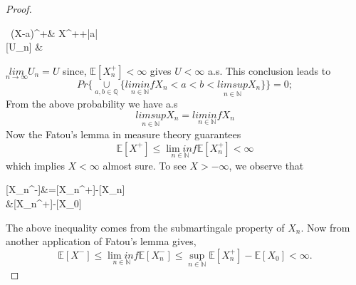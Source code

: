 \documentclass[a4paper,10pt,english]{article}
\begin{document}
    	\begin{proof}
    		\begin{flalign*}\
    			(X-a)^{+}\leq& X^{+}+|a|\\
    			[U_n] \leq& \\
    			\end{flalign*}
    			$\underset{n\to \infty}{lim} U_n=U$ since, $\mathbb{E} [X_n^{+}]< \infty$ gives $U<\infty$ a.s. This conclusion leads to  
    			\begin{equation*}
    			Pr\{\underset{a,b \in \mathbb{Q}}{\cup}\{\underset{n\in \mathbb{N}}{lim inf}  X_n<a<b<\underset{n\in \mathbb{N}}{lim sup}  X_n \}\} = 0;
    			\end{equation*}
    		  From the above probability we have a.s
    		  \begin{equation*}
    		  	\underset{n\in \mathbb{N}}{lim sup}  X_n=\underset{n\in \mathbb{N}}{lim inf}  X_n
    		  	\end{equation*}
    		  	Now the Fatou's lemma in measure theory guarantees \\
    		  	\begin {equation*}
    		  	\mathbb{E}[X^{+}]\leq \underset{n\in \mathbb{N}}{\lim inf}\mathbb{E}[X_n^{+}]<\infty
    		  \end{equation*}
    		  	which implies $X<\infty$  almost sure. To see $X>-\infty$, we observe that
    		  	\begin{flalign*}
    		  		[X_n^{-}]&=[X_n^{+}]-[X_n]\\
    		  		&\leq \mathbb{E}[X_n^{+}]-\mathbb{E}[X_0]\\
    		  		\end{flalign*} 
    		  		The above inequality comes from the submartingale property of $X_n$. Now from another application of Fatou's lemma gives,
    		  		\begin{equation*}
    		  		\mathbb{E}[X^{-}]\leq \underset{n\in \mathbb{N}}{\lim inf}\mathbb{E}[X_n^{-}] \leq \underset{n\in \mathbb{N}}{\sup}\mathbb{E}[X_n^{+}]-\mathbb{E}[X_0]<\infty.
    		  		\end{equation*}
    		\end{proof}
\end{document}
